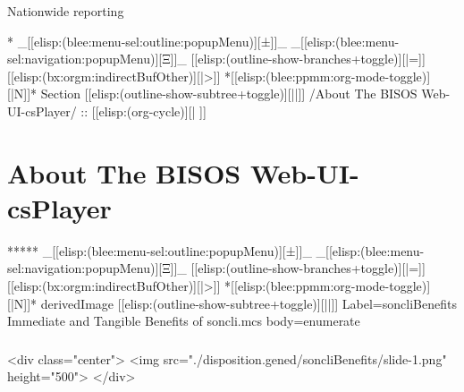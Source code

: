 \begin{whenOrg}
\begin{verblatex}
\begin{frame}[fragile,plain,label=soncliBenefits]
    Nationwide reporting




\end{frame}
\end{verblatex}


\begin{whenOrg}
*  _[[elisp:(blee:menu-sel:outline:popupMenu)][±]]_ _[[elisp:(blee:menu-sel:navigation:popupMenu)][Ξ]]_ [[elisp:(outline-show-branches+toggle)][|=]] [[elisp:(bx:orgm:indirectBufOther)][|>]] *[[elisp:(blee:ppmm:org-mode-toggle)][|N]]*  Section    [[elisp:(outline-show-subtree+toggle)][||]]   /About The BISOS Web-UI-csPlayer/ ::  [[elisp:(org-cycle)][| ]]
\end{whenOrg}

\section{About The BISOS Web-UI-csPlayer}


\begin{whenOrg}
*****  _[[elisp:(blee:menu-sel:outline:popupMenu)][±]]_ _[[elisp:(blee:menu-sel:navigation:popupMenu)][Ξ]]_ [[elisp:(outline-show-branches+toggle)][|=]] [[elisp:(bx:orgm:indirectBufOther)][|>]] *[[elisp:(blee:ppmm:org-mode-toggle)][|N]]*  derivedImage [[elisp:(outline-show-subtree+toggle)][||]] Label=soncliBenefits Immediate and Tangible Benefits of soncli.mcs body=enumerate
\end{whenOrg}

\begin{htmlonly}

\begin{frame}[fragile,plain,label=soncliBenefits]
    \frametitle{}
    \framesubtitle{}
    \begin{rawhtml}
<div class="center">
<img src="./disposition.gened/soncliBenefits/slide-1.png" height="500">
</div>
    \end{rawhtml}
\end{frame}
\end{htmlonly}


\end{whenOrg}
